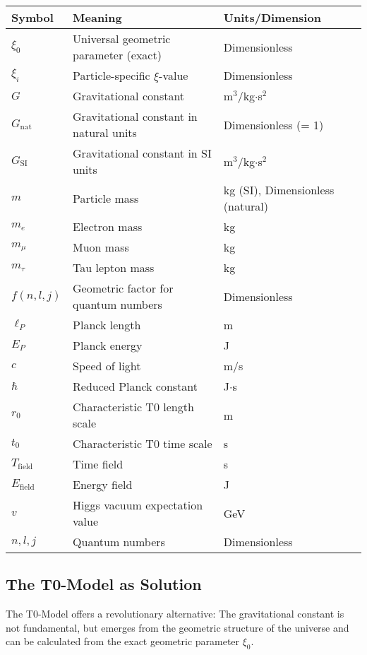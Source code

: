 \documentclass[12pt,a4paper]{article}
\theoremstyle{definition}
\begin{document}
	\begin{center}
		\begin{tabular}{lll}
			\toprule
			\textbf{Symbol} & \textbf{Meaning} & \textbf{Units/Dimension} \\
			\midrule
			$\xi_0$ & Universal geometric parameter (exact) & Dimensionless \\
			$\xi_i$ & Particle-specific $\xi$-value & Dimensionless \\
			$G$ & Gravitational constant & m$^3$/kg$\cdot$s$^2$ \\
			$G_{\text{nat}}$ & Gravitational constant in natural units & Dimensionless (= 1) \\
			$G_{\text{SI}}$ & Gravitational constant in SI units & m$^3$/kg$\cdot$s$^2$ \\
			$m$ & Particle mass & kg (SI), Dimensionless (natural) \\
			$m_e$ & Electron mass & kg \\
			$m_\mu$ & Muon mass & kg \\
			$m_\tau$ & Tau lepton mass & kg \\
			$f(n,l,j)$ & Geometric factor for quantum numbers & Dimensionless \\
			$\ell_P$ & Planck length & m \\
			$E_P$ & Planck energy & J \\
			$c$ & Speed of light & m/s \\
			$\hbar$ & Reduced Planck constant & J$\cdot$s \\
			$r_0$ & Characteristic T0 length scale & m \\
			$t_0$ & Characteristic T0 time scale & s \\
			$T_{\text{field}}$ & Time field & s \\
			$E_{\text{field}}$ & Energy field & J \\
			$v$ & Higgs vacuum expectation value & GeV \\
			$n,l,j$ & Quantum numbers & Dimensionless \\
			\bottomrule
		\end{tabular}
	\end{center}
	
	\subsection{The T0-Model as Solution}
	
	The T0-Model offers a revolutionary alternative: The gravitational constant is not fundamental, but emerges from the geometric structure of the universe and can be calculated from the exact geometric parameter $\xi_0$.
	
\end{document}
